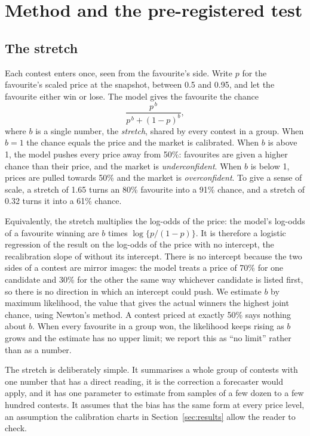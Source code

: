 \section{Method and the pre-registered test}\label{sec:method}

\subsection{The stretch}

Each contest enters once, seen from the favourite's side. Write $p$ for the favourite's scaled price at the snapshot,
between 0.5 and 0.95, and let the favourite either win or lose. The model gives the favourite the chance
\begin{equation}\label{eq:stretch}
  \frac{p^{\,b}}{p^{\,b} + (1-p)^{b}},
\end{equation}
where $b$ is a single number, the \emph{stretch}, shared by every contest in a group. When $b = 1$ the chance equals the
price and the market is calibrated. When $b$ is above 1, the model pushes every price away from 50\%: favourites are
given a higher chance than their price, and the market is \emph{underconfident}. When $b$ is below 1, prices are
pulled towards 50\% and the market is \emph{overconfident}. To give a sense of scale, a stretch of 1.65 turns an 80\%
favourite into a 91\% chance, and a stretch of 0.32 turns it into a 61\% chance.

Equivalently, the stretch multiplies the log-odds of the price: the model's log-odds of a favourite winning are $b$
times $\log\{p/(1-p)\}$. It is therefore a logistic regression of the result on the log-odds of the price with no
intercept, the recalibration slope of \citet{le2026} without its intercept. There is no intercept because the two sides
of a contest are mirror images: the model treats a price of 70\% for one candidate and 30\% for the other the same way
whichever candidate is listed first, so there is no direction in which an intercept could push. We estimate $b$ by
maximum likelihood, the value that gives the actual winners the highest joint chance, using Newton's method. A contest
priced at exactly 50\% says nothing about $b$. When every favourite in a group won, the likelihood keeps rising as $b$
grows and the estimate has no upper limit; we report this as ``no limit'' rather than as a number.

The stretch is deliberately simple. It summarises a whole group of contests with one number that has a direct reading,
it is the correction a forecaster would apply, and it has one parameter to estimate from samples of a few dozen to a
few hundred contests. It assumes that the bias has the same form at every price level, an assumption the calibration
charts in Section~\ref{sec:results} allow the reader to check.


